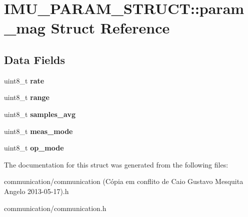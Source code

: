 \hypertarget{structIMU__PARAM__STRUCT_1_1param__mag}{
\section{IMU\_\-PARAM\_\-STRUCT::param\_\-mag Struct Reference}
\label{structIMU__PARAM__STRUCT_1_1param__mag}
}
\subsection*{Data Fields}
\begin{DoxyCompactItemize}
\item 
\hypertarget{structIMU__PARAM__STRUCT_1_1param__mag_a234de95423b604b05b851ef90890cea1}{
uint8\_\-t {\bfseries rate}}
\label{structIMU__PARAM__STRUCT_1_1param__mag_a234de95423b604b05b851ef90890cea1}

\item 
\hypertarget{structIMU__PARAM__STRUCT_1_1param__mag_a40ad27ebdb5fde35257b1dc52e40f476}{
uint8\_\-t {\bfseries range}}
\label{structIMU__PARAM__STRUCT_1_1param__mag_a40ad27ebdb5fde35257b1dc52e40f476}

\item 
\hypertarget{structIMU__PARAM__STRUCT_1_1param__mag_a52c22cae6940eb39fb72aca66cfeba9a}{
uint8\_\-t {\bfseries samples\_\-avg}}
\label{structIMU__PARAM__STRUCT_1_1param__mag_a52c22cae6940eb39fb72aca66cfeba9a}

\item 
\hypertarget{structIMU__PARAM__STRUCT_1_1param__mag_a1f3536709c05310005d648f339d70c54}{
uint8\_\-t {\bfseries meas\_\-mode}}
\label{structIMU__PARAM__STRUCT_1_1param__mag_a1f3536709c05310005d648f339d70c54}

\item 
\hypertarget{structIMU__PARAM__STRUCT_1_1param__mag_a39b83b3e9ff5bdcafed0bdf6a2de584b}{
uint8\_\-t {\bfseries op\_\-mode}}
\label{structIMU__PARAM__STRUCT_1_1param__mag_a39b83b3e9ff5bdcafed0bdf6a2de584b}

\end{DoxyCompactItemize}


The documentation for this struct was generated from the following files:\begin{DoxyCompactItemize}
\item 
communication/communication (Cópia em conflito de Caio Gustavo Mesquita Angelo 2013-\/05-\/17).h\item 
communication/communication.h\end{DoxyCompactItemize}
